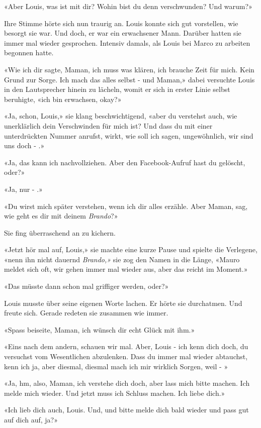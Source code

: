 «Aber Louis, was ist mit dir? Wohin bist du denn verschwunden? Und
warum?»

Ihre Stimme hörte sich nun traurig an. Louis konnte sich gut vorstellen, wie
besorgt sie war. Und doch, er war ein erwachsener Mann. Darüber hatten
sie immer mal wieder gesprochen. Intensiv damals, als Louis bei Marco zu
arbeiten begonnen hatte.

«Wie ich dir sagte, Maman, ich muss was klären, ich brauche Zeit für
mich. Kein Grund zur Sorge. Ich mach das alles selbst - und Maman,»
dabei versuchte Louis in den Lautsprecher hinein zu lächeln, womit er sich
in erster Linie selbst beruhigte, «ich bin erwachsen, okay?»

«Ja, schon, Louis,» sie klang beschwichtigend, «aber du verstehst auch,
wie unerklärlich dein Verschwinden für mich ist? Und dass du mit einer
unterdrückten Nummer anrufst, wirkt, wie soll ich sagen, ungewöhnlich,
wir sind uns doch - .»

«Ja, das kann ich nachvollziehen. Aber den Facebook-Aufruf hast du
gelöscht, oder?»

«Ja, nur - .»

«Du wirst mich später verstehen, wenn ich dir alles erzähle. Aber Maman,
sag, wie geht es dir mit deinem \emph{Brando}?»

Sie fing überraschend an zu kichern.

«Jetzt hör mal auf, Louis,» sie machte eine kurze Pause und spielte die
Verlegene, «nenn ihn nicht dauernd \emph{Brando,»} sie zog den Namen in
die Länge, «Mauro meldet sich oft, wir gehen immer mal wieder aus, aber
das reicht im Moment.»

«Das müsste dann schon mal griffiger werden, oder?»

Louis musste über seine eigenen Worte lachen. Er hörte sie durchatmen.
Und freute sich. Gerade redeten sie zusammen wie immer. 

«Spass beiseite, Maman, ich wünsch dir echt Glück mit ihm.»

«Eins nach dem andern, schauen wir mal. Aber, Louis - ich kenn dich doch, du versuchst vom Wesentlichen abzulenken. Dass du immer mal wieder abtauchst, kenn ich ja, aber diesmal, diesmal mach ich mir wirklich Sorgen, weil - »

«Ja, hm, also, Maman, ich verstehe dich doch, aber lass mich bitte machen. Ich melde mich wieder. Und jetzt muss ich Schluss machen. Ich liebe dich.»

«Ich lieb dich auch, Louis. Und, und bitte melde dich bald wieder und pass gut auf dich auf, ja?»

